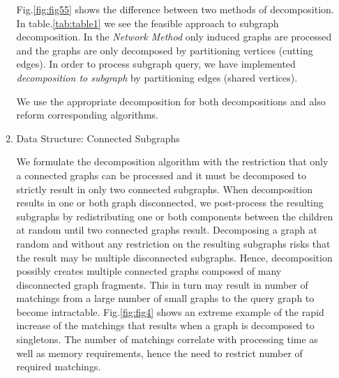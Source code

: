 \begin{enumerate}
\begin{enumerate}




Fig.\ref{fig:fig55} shows the difference between two methods of decomposition.
In table.\ref{tab:table1} we see the feasible approach to subgraph decomposition.
In the \textit{Network Method} only induced graphs are processed and the graphs are only decomposed by partitioning vertices (cutting edges).
In order to process subgraph query, we have implemented \textit{decomposition to subgraph} by partitioning edges (shared vertices). 


We use the appropriate decomposition for both decompositions and also reform corresponding algorithms.

\item Data Structure: Connected Subgraphs

We formulate the decomposition algorithm with the restriction that only a connected graphs can be processed and it must be decomposed to strictly result in only two connected subgraphs. 
When decomposition results in one or both graph disconnected, we post-process the resulting subgraphs by redistributing one or both components between the children at random until two connected graphs result.
Decomposing a graph at random and without any restriction on the resulting subgraphs risks that the result may be multiple disconnected subgraphs.
Hence, decomposition possibly creates multiple connected graphs composed of many disconnected graph fragments. 
This in turn may result in number of matchings from a large number of small graphs to the query graph to become intractable.
Fig.\ref{fig:fig4} shows an extreme example of the rapid increase of the matchings that results when a graph is decomposed to singletons.
The number of matchings correlate with processing time as well as memory requirements, hence the need to restrict number of required matchings. 


\end{enumerate}
\end{enumerate}
